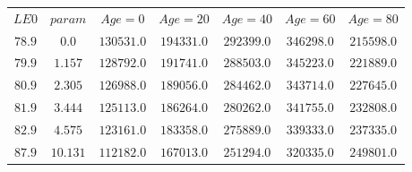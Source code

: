 \begin{tabular}{ccccccc}
$LE0$ & $param$ & $Age=0$ & $Age=20$ & $Age=40$ & $Age=60$ & $Age=80$\\
$78.9$ & $0.0$ & $130531.0$ & $194331.0$ & $292399.0$ & $346298.0$ & $215598.0$\\
$79.9$ & $1.157$ & $128792.0$ & $191741.0$ & $288503.0$ & $345223.0$ & $221889.0$\\
$80.9$ & $2.305$ & $126988.0$ & $189056.0$ & $284462.0$ & $343714.0$ & $227645.0$\\
$81.9$ & $3.444$ & $125113.0$ & $186264.0$ & $280262.0$ & $341755.0$ & $232808.0$\\
$82.9$ & $4.575$ & $123161.0$ & $183358.0$ & $275889.0$ & $339333.0$ & $237335.0$\\
$87.9$ & $10.131$ & $112182.0$ & $167013.0$ & $251294.0$ & $320335.0$ & $249801.0$\\
\end{tabular}

